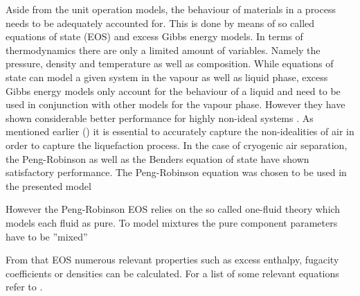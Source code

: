 ﻿    Aside from the unit operation models, the behaviour of materials in a process needs to be adequately
        accounted for. This is done by means of so called equations of state (EOS) and excess Gibbs energy
        models. In terms of thermodynamics there are only a limited amount of variables. Namely the pressure,
        density and temperature as well as composition. While equations of state can model a given system in
        the vapour as well as liquid phase, excess Gibbs energy models only account for the behaviour of a liquid
        and need to be used in conjunction with other models for the vapour phase. However they have shown
        considerable better performance for highly non-ideal systems \cite{AndreasPfennig.2003}. As mentioned
        earlier () it is essential to accurately capture the non-idealities of air
        in order to capture the liquefaction process. In the case of cryogenic air separation, the Peng-Robinson
        as well as the Benders equation of state have shown satisfactory performance. The Peng-Robinson equation
        was chosen to be used in the presented model

        However the Peng-Robinson EOS relies on the so called one-fluid theory which models each fluid as pure.
        To model mixtures the pure component parameters have to be ''mixed''

        From that EOS numerous relevant properties such as excess enthalpy, fugacity coefficients or densities
        can be calculated. For a list of some relevant equations refer to .
